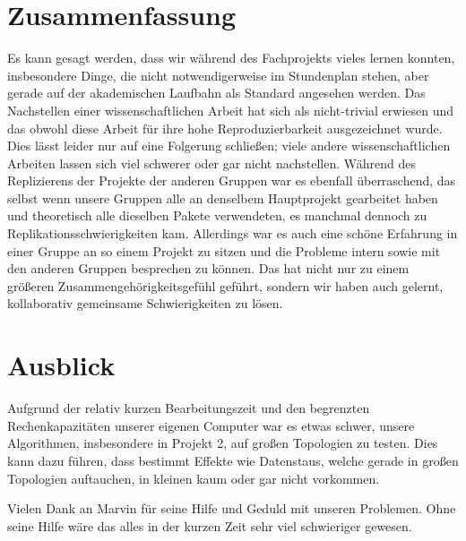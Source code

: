 \documentclass[sigconf, nonacm, review]{acmart}
\begin{document}
\section{Zusammenfassung}
Es kann gesagt werden, dass wir w\"ahrend des Fachprojekts vieles lernen konnten, 
insbesondere Dinge, die nicht notwendigerweise im Stundenplan stehen, 
aber gerade auf der akademischen Laufbahn als Standard angesehen werden.
Das Nachstellen einer wissenschaftlichen Arbeit hat sich als nicht-trivial erwiesen 
und das obwohl diese Arbeit f\"ur ihre hohe Reproduzierbarkeit ausgezeichnet wurde.
Dies l\"asst leider nur auf eine Folgerung schlie\ss en; viele andere wissenschaftlichen Arbeiten lassen sich viel schwerer oder gar nicht nachstellen. 
W\"ahrend des Replizierens der Projekte der anderen Gruppen war es ebenfall \"uberraschend, 
das selbst wenn unsere Gruppen alle an denselbem Hauptprojekt gearbeitet haben 
und theoretisch alle dieselben Pakete verwendeten, 
es manchmal dennoch zu Replikationsschwierigkeiten kam.
Allerdings war es auch eine sch\"one Erfahrung in einer Gruppe an so einem Projekt zu sitzen 
und die Probleme intern sowie mit den anderen Gruppen besprechen zu k\"onnen.
Das hat nicht nur zu einem gr\"o\ss eren Zusammengeh\"origkeitsgef\"uhl gef\"uhrt,
sondern wir haben auch gelernt, kollaborativ gemeinsame Schwierigkeiten zu l\"osen. 

\section{Ausblick}
Aufgrund der relativ kurzen Bearbeitungszeit und den begrenzten Rechenkapazit\"aten unserer eigenen Computer war es etwas schwer, unsere Algorithmen, insbesondere in Projekt 2, auf gro\ss en Topologien zu testen.
Dies kann dazu f\"uhren, dass bestimmt Effekte wie Datenstaus, welche gerade in gro\ss en Topologien auftauchen, in kleinen kaum oder gar nicht vorkommen.

\begin{acks}
Vielen Dank an Marvin f\"ur seine Hilfe und Geduld mit unseren Problemen. Ohne seine Hilfe w\"are das alles in der kurzen Zeit sehr viel schwieriger gewesen.
\end{acks}



\end{document}
